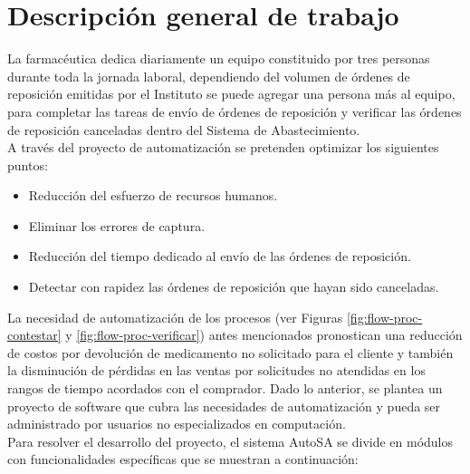\section{Descripción general de trabajo}
La farmacéutica dedica diariamente un equipo constituido por tres personas durante toda la jornada laboral, dependiendo del volumen de órdenes de reposición emitidas por el Instituto se puede agregar una persona más al equipo, para completar las tareas de envío de órdenes de reposición y verificar las órdenes de reposición canceladas dentro del Sistema de Abastecimiento.\\
A través del proyecto de automatización se pretenden optimizar los siguientes puntos:
\begin{itemize}
\item Reducción del esfuerzo de recursos humanos.
\item Eliminar los errores de captura.
\item Reducción del tiempo dedicado al envío de las órdenes de reposición.
\item Detectar con rapidez las órdenes de reposición que hayan sido canceladas.
\end{itemize}
La necesidad de automatización de los procesos (ver Figuras \ref{fig:flow-proc-contestar} y \ref{fig:flow-proc-verificar}) antes mencionados pronostican una reducción de costos por devolución de medicamento no solicitado para el cliente y también la disminución de pérdidas en las ventas por solicitudes no atendidas en los rangos de tiempo acordados con el comprador. Dado lo anterior, se plantea un proyecto de software que cubra las necesidades de automatización y pueda ser administrado por usuarios no especializados en computación.\\
Para resolver el desarrollo del proyecto, el sistema AutoSA se divide en módulos con funcionalidades específicas que se muestran a continuación:
